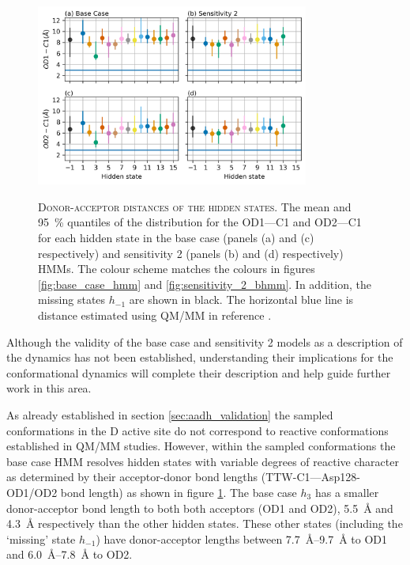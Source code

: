 \begin{figure}
    \centering
    \caption[Donor-acceptor distances of the hidden states]{\textsc{Donor-acceptor distances of the hidden states}. The mean and \SI{95}{\percent} quantiles of the distribution for the OD1---C1 and OD2---C1  for each hidden state in the base case (panels (a) and (c) respectively) and sensitivity 2 (panels (b) and (d) respectively) HMMs. The colour scheme matches the colours in figures \ref{fig:base_case_hmm} and \ref{fig:sensitivity_2_bhmm}. In addition, the missing states $h_{-1}$ are shown in black. The horizontal blue line is distance estimated using QM/MM in reference \cite{ranaghanInitioQMMM2017}.}
    \includegraphics[width=0.8\textwidth]{chapters/aadh/figures/bond_dist_h_states.png}
    \label{fig:addh_bond_dist_h_state}
\end{figure}

Although the validity of the base case and sensitivity 2 models as a description of the dynamics has not been established, understanding their implications for the conformational dynamics will complete their description and help guide further work in this area. 

As already established in section \ref{sec:aadh_validation} the sampled conformations in the D active site do not correspond to reactive conformations established in QM/MM studies.  However, within the sampled conformations the base case HMM resolves hidden states with variable degrees of reactive character as determined  by their acceptor-donor bond lengths (TTW-C1---Asp128-OD1/OD2 bond length) as shown in figure \ref{fig:addh_bond_dist_h_state}. The base case $h_{3}$ has a smaller donor-acceptor bond length to both both acceptors (OD1 and OD2), \SI{5.5}{\angstrom} and \SI{4.3}{\angstrom} respectively than the other hidden states. These other states (including the `missing' state $h_{-1}$) have donor-acceptor lengths between \SIrange{7.7}{9.7}{\angstrom} to OD1 and \SIrange{6.0}{7.8}{\angstrom} to OD2. 

